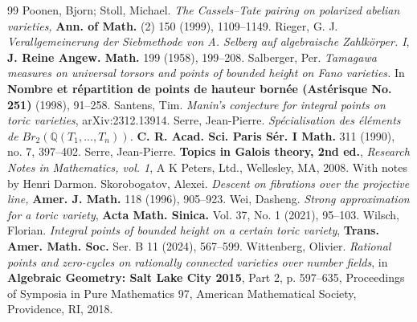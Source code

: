 \documentclass[11pt,letterpaper]{amsart}
\newcommand{\BQ}{{\mathbb {Q}}}
\theoremstyle{plain}
\numberwithin{equation}{section}
\theoremstyle{definition}
\theoremstyle{remark}
\begin{document}
\begin{thebibliography}{99}
	 Poonen, Bjorn; Stoll, Michael. \emph{The Cassels–Tate pairing on polarized abelian varieties,} \textbf{Ann. of Math.} (2) 150 (1999), 1109–1149.
	 Rieger, G. J.  \emph{Verallgemeinerung der Siebmethode von A. Selberg auf algebraische Zahlkörper. I}, \textbf{J. Reine Angew. Math.} 199 (1958), 199–208.
	 Salberger, Per. \emph{Tamagawa measures on universal torsors and points of bounded height on Fano varieties.} In \textbf{Nombre et répartition de points de hauteur bornée (Astérisque No. 251)} (1998), 91–258. 
	 Santens, Tim. \emph{Manin's conjecture for integral points on toric varieties}, arXiv:2312.13914.
	  Serre, Jean-Pierre. \emph{Spécialisation des éléments de $Br_2(\BQ(T_1, . . . , T_n))$.} \textbf{ C. R. Acad. Sci. Paris Sér. I Math.} 311 (1990), no. 7, 397–402.
	 Serre, Jean-Pierre. \textbf{Topics in Galois theory, 2nd ed.}, \emph{Research Notes in Mathematics, vol. 1}, A K Peters, Ltd., Wellesley, MA, 2008. With notes by Henri Darmon.
	 Skorobogatov, Alexei. \emph{Descent on fibrations over the projective line,} \textbf{Amer. J. Math.} 118 (1996), 905–923.
	 Wei, Dasheng. \emph{Strong approximation for a toric variety},  \textbf{Acta Math. Sinica.} Vol. 37, No. 1 (2021), 95--103. 
	 Wilsch, Florian. \emph{Integral points of bounded height on a certain toric variety}, \textbf{Trans. Amer. Math. Soc.} Ser. B 11 (2024), 567–599. 
	 Wittenberg, Olivier. \emph{Rational points and zero-cycles on rationally connected varieties over number fields}, in \textbf{Algebraic Geometry: Salt Lake City 2015}, Part 2, p. 597–635, Proceedings of Symposia in Pure Mathematics 97, American Mathematical Society, Providence, RI, 2018.
\end{thebibliography}
\end{document}

